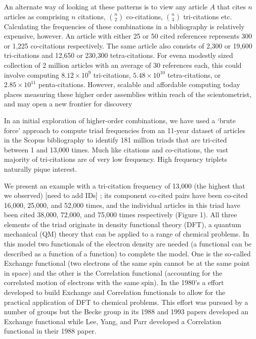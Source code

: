 \documentclass[notitlepage]{report}
\begin{document}
An alternate way of looking at these patterns is to view any article $A$ that cites $n$ articles as comprising $n$ citations, $n\choose2$ co-citations, $n\choose3$ tri-citations etc. Calculating the frequencies of these combinations in a bibliography is relatively expensive, however. An article with either 25 or 50 cited references represents 300 or 1,225 co-citations respectively. The same article also consists of  2,300 or 19,600 tri-citations and  12,650 or  230,300 tetra-citations. For evena modestly sized collection of 2 million articles with an average of 30 references each, this could involve computing $8.12\times10^9$ tri-citations, $5.48\times10^{10}$ tetra-citations, or $2.85\times10^{11}$ penta-citations.  However, scalable and affordable computing today places measuring these higher order assemblies within reach of the scientometrist, and may open a new frontier for discovery

In an initial exploration of higher-order combinations, we have used a `brute force' approach to compute triad frequencies from an 11-year dataset of articles in the Scopus bibliography to identify 181 million triads that are tri-cited between 1 and 13,000 times. Much like citations and co-citations, the vast majority of tri-citations are of very low frequency. High frequency triplets naturally pique interest. 

We present an example with a tri-citation frequency of 13,000 (the highest that we observed) [need to add IDs] ; its component co-cited pairs have been co-cited 16,000, 25,000, and 52,000 times, and the individual articles in this triad have been cited 38,000, 72,000, and 75,000 times respectively (Figure 1). All three elements of the triad originate in density functional theory (DFT), a quantum mechanical (QM) theory that can be applied to a range of chemical problems. In this model two functionals of the electron density are needed (a functional can be described as a function of a function) to complete the model. One is the so-called Exchange functional (two electrons of the same spin cannot be at the same point in space) and the other is the Correlation functional (accounting for the correlated motion of electrons with the same spin). In the 1980’s a effort developed to build Exchange and Correlation functionals to allow for the practical application of DFT to chemical problems. This effort was pursued by a number of groups but the Becke group in its 1988 and 1993 papers developed an Exchange functional while Lee, Yang, and Parr developed a Correlation functional in their 1988 paper. 
\end{document}
